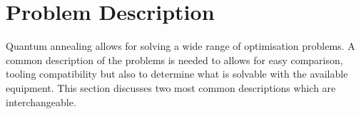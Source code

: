 \section{Problem Description}
Quantum annealing allows for solving a wide range of optimisation problems. A common description of the problems is needed to allows for easy comparison, tooling compatibility but also to determine what is solvable with the available equipment. This section discusses two most common descriptions which are interchangeable.


